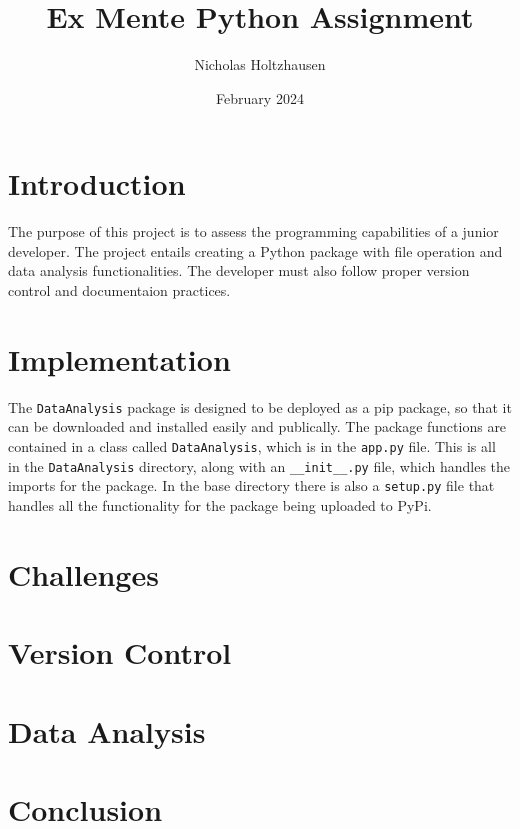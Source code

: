 \documentclass[12pt]{article}
\title{Ex Mente Python Assignment}
\author{Nicholas Holtzhausen}
\date{February 2024}
\begin{document}
\maketitle

\section{Introduction}
The purpose of this project is to assess the programming capabilities of a
junior developer. The project entails creating a Python package with file
operation and data analysis functionalities. The developer must also follow
proper version control and documentaion practices.

\section{Implementation}
The \verb|DataAnalysis| package is designed to be deployed as a pip package,
so that it can be downloaded and installed easily and publically. The package
functions are contained in a class called \verb|DataAnalysis|, which is in the
\verb|app.py| file. This is all in the \verb|DataAnalysis| directory, along
with an \verb|__init__.py| file, which handles the imports for the package. In
the base directory there is also a \verb|setup.py| file that handles all the
functionality for the package being uploaded to PyPi.

\section{Challenges}

\section{Version Control}

\section{Data Analysis}

\section{Conclusion}
\end{document}
